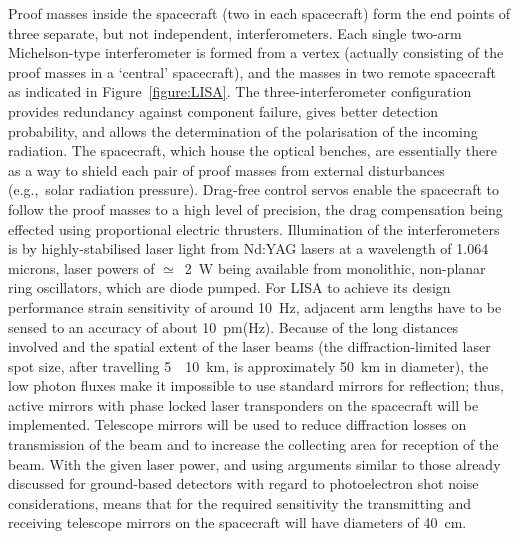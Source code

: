 \documentclass{article}
\newcommand{\Hz}{Hz\super{-1/2}\xspace}
\begin{document}
Proof masses inside the spacecraft (two in each spacecraft) form the end points
of three separate, but not independent, interferometers. Each single two-arm
Michelson-type interferometer is formed from a vertex (actually consisting of
the proof masses in a `central' spacecraft), and the masses in two remote
spacecraft as indicated in Figure~\ref{figure:LISA}. The three-interferometer
configuration provides redundancy against component failure, gives better
detection probability, and allows the determination of the polarisation of the
incoming radiation. The spacecraft, which house the optical benches, are
essentially there as a way to shield each pair of proof masses from external
disturbances (e.g.,~solar radiation pressure). Drag-free control servos enable
the spacecraft to follow the proof masses to a high level of precision, the drag
compensation being effected using proportional electric thrusters. Illumination
of the interferometers is by highly-stabilised laser light from Nd:YAG lasers at
a wavelength of 1.064 microns, laser powers of $\simeq$~2~W being available from
monolithic, non-planar ring oscillators, which are diode pumped.  For LISA to
achieve its design performance strain sensitivity of around
10~\Hz, adjacent arm lengths have to be sensed
to an accuracy of about 10~pm(Hz). Because of
the long distances involved and the spatial extent of the laser beams
(the diffraction-limited laser spot size, after travelling
5~\texttimes~10~km, is approximately 50~km in diameter), the low
photon fluxes make it impossible to use standard mirrors for
reflection; thus, active mirrors with phase locked laser transponders
on the spacecraft will be implemented. Telescope mirrors will be used
to reduce diffraction losses on transmission of the beam and to
increase the collecting area for reception of the beam. With the given
laser power, and using arguments similar to those already discussed
for ground-based detectors with regard to photoelectron shot noise
considerations, means that for the required sensitivity the
transmitting and receiving telescope mirrors on the spacecraft will
have diameters of 40~cm.

\end{document}

